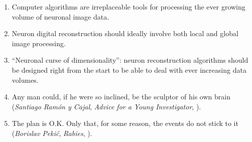\documentclass[10pt]{report}
\begin{document}
\begin{enumerate}
\medskip 

\item Computer algorithms are irreplaceable tools for processing the ever growing volume of neuronal image data. 

\medskip
  
\item Neuron digital reconstruction should ideally involve both local and global image processing.

\medskip

\item ``Neuronal curse of dimensionality'': neuron reconstruction algorithms should be designed right from the start to be able to deal with ever increasing data volumes.

\medskip

\item Any man could, if he were so inclined, be the sculptor of his own brain (\emph{Santiago Ram\'{o}n y Cajal}, \emph{Advice for a Young Investigator}, ).

\medskip

\item The plan is O.K. Only that, for some reason, the events do not stick to it (\emph{Borislav Peki\'{c}}, \emph{Rabies}, ).

\end{enumerate}

\end{document}
